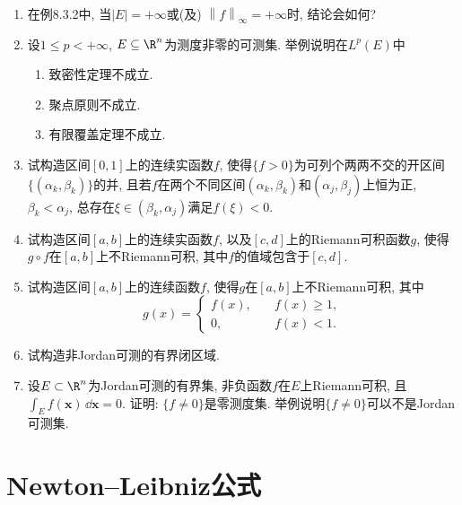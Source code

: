 \begin{quizb}
\begin{enumerate}
\item 在例8.3.2中, 当\(|E|=+\infty\)或(及) \(\left\|f\right\|_{\infty}=+\infty\)时, 结论会如何?

\item 设\(1\leqslant p<+\infty\), \(E\subseteq\R^n\)为测度非零的可测集. 
举例说明在\(L^p(E)\)中\begin{enumerate}[label=(\arabic*)]
\item 致密性定理不成立.
\item 聚点原则不成立.
\item 有限覆盖定理不成立.
\end{enumerate}

\item 试构造区间\([0,1]\)上的连续实函数\(f\), 使得\(\{f>0\}\)为可列个两两不交的开区间\(\{(\alpha_k,\beta_k)\}\)的并, 
且若\(f\)在两个不同区间\((\alpha_k,\beta_k)\)和\((\alpha_j,\beta_j)\)上恒为正, 
\(\beta_k<\alpha_j\), 总存在\(\xi\in(\beta_k,\alpha_j)\)满足\(f(\xi)<0\).

\item 试构造区间\([a,b]\)上的连续实函数\(f\), 以及\([c,d]\)上的Riemann可积函数\(g\), 
使得\(g\circ f\)在\([a,b]\)上不Riemann可积, 其中\(f\)的值域包含于\([c,d]\).

\item 试构造区间\([a,b]\)上的连续函数\(f\), 使得\(g\)在\([a,b]\)上不Riemann可积, 其中
\[g(x)=\begin{cases}
f(x),\quad&f(x)\geqslant 1,\\
0,& f(x)<1.
\end{cases}\]

\item 试构造非Jordan可测的有界闭区域.

\item 设\(E\subset\R^n\)为Jordan可测的有界集, 非负函数\(f\)在\(E\)上Riemann可积, 
且\(\int_E f(\boldsymbol{x})\,\dd\boldsymbol{x}=0.\) 
证明: \(\{f\ne 0\}\)是零测度集. 举例说明\(\{f\ne 0\}\)可以不是Jordan可测集.
\end{enumerate}
\end{quizb}

\section{Newton--Leibniz公式}
